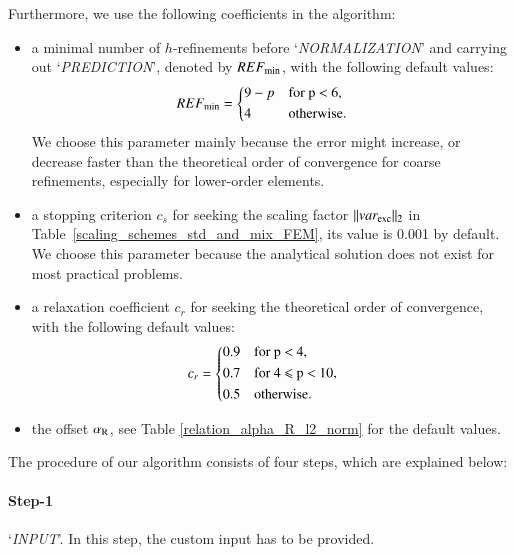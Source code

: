\documentclass[review,3p]{elsarticle}
\begin{document}
Furthermore, we use the following coefficients in the algorithm:		%
\begin{itemize}
  \renewcommand\labelitemi{--}
  \item a minimal number of $h$-refinements before `\textit{NORMALIZATION}' and carrying out `\textit{PREDICTION}', denoted by $REF_{\rm min}$, with the following default values:
  \begin{equation}
  \begin{aligned}
      REF_{\rm min} &=
      \begin{cases*}
	9-p & for p $<$ 6, \\
	4 & otherwise.
      \end{cases*}
  \end{aligned}
  \end{equation} 
  We choose this parameter mainly because the error might increase, or decrease faster than the theoretical order of convergence for coarse refinements, especially for lower-order elements.
  \item a stopping criterion $c_s$ for seeking the scaling factor $\|var_{\rm exc}\|_{2}$ in Table~\ref{scaling_schemes_std_and_mix_FEM}, its value is 0.001 by default. We choose this parameter because the analytical solution does not exist for most practical problems.
  \item a relaxation coefficient $c_r$ for seeking the theoretical order of convergence, with the following default values: 
    \begin{equation}
    \begin{aligned}
	c_r &=
	\begin{cases*}
	  0.9 & for p $<$ 4, \\
	  0.7 & for 4 $\leqslant$ p $<$ 10, \\
	  0.5 & otherwise.
	\end{cases*}
    \end{aligned}
    \end{equation}
  \item the offset $\alpha _{\rm R}$, see Table \ref{relation_alpha_R_l2_norm} for the default values.
\end{itemize}

The procedure of our algorithm consists of four steps, which are explained below:

\paragraph{Step-1} `\textit{INPUT}'. In this step, the custom input has to be provided.
\end{document}
